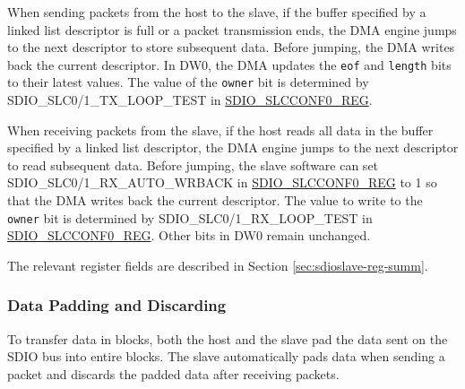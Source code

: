 \documentclass[main\_\_EN.tex]{subfiles}
\begin{document}
When sending packets from the host to the slave, if the buffer specified by a linked list descriptor is full or a packet transmission ends, the DMA engine jumps to the next descriptor to store subsequent data. Before jumping, the DMA writes back the current descriptor. In DW0, the DMA updates the \texttt{eof} and \texttt{length} bits to their latest values. The value of the \texttt{owner} bit is determined by SDIO\_SLC0/1\_TX\_LOOP\_TEST in \hyperref[regdesc:SDIOSLCCONF0REG]{SDIO\_SLCCONF0\_REG}.

When receiving packets from the slave, if the host reads all data in the buffer specified by a linked list descriptor, the DMA engine jumps to the next descriptor to read subsequent data. Before jumping, the slave software can set SDIO\_SLC0/1\_RX\_AUTO\_WRBACK in \hyperref[regdesc:SDIOSLCCONF0REG]{SDIO\_SLCCONF0\_REG} to 1 so that the DMA writes back the current descriptor. The value to write to the \texttt{owner} bit is determined by SDIO\_SLC0/1\_RX\_LOOP\_TEST in \hyperref[regdesc:SDIOSLCCONF0REG]{SDIO\_SLCCONF0\_REG}. Other bits in DW0 remain unchanged.

The relevant register fields are described in Section \ref{sec:sdioslave-reg-summ}.

\subsubsection{Data Padding and Discarding}
\label{sec:sdioslave-dummy-data}

To transfer data in blocks, both the host and the slave pad the data sent on the SDIO bus into entire blocks. The slave automatically pads data when sending a packet and discards the padded data after receiving packets.
\end{document}
